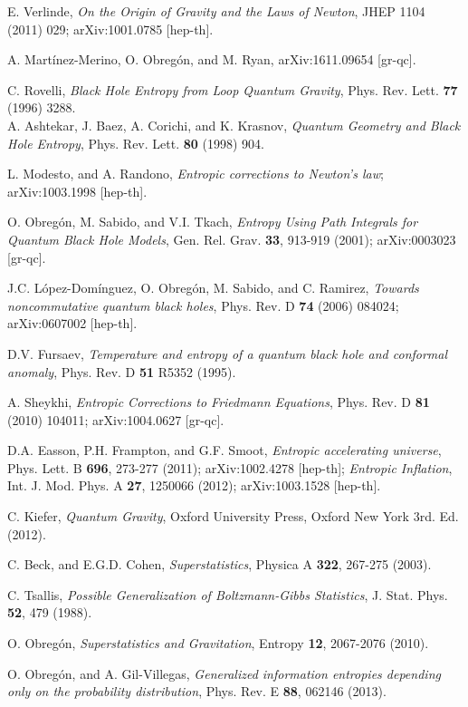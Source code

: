 \documentclass[nofootinbib,aps,prd,preprint,groupedaddress,showpacs,showkeys]{revtex4-1}
\begin{document}
\begin{thebibliography}{99}
 E. Verlinde, {\it On the Origin of Gravity and the Laws of Newton}, JHEP 1104 (2011) 029; arXiv:1001.0785 [hep-th].

 A. Mart\'inez-Merino, O. Obreg\'on, and M. Ryan, arXiv:1611.09654 [gr-qc].

 C. Rovelli, \textit{Black Hole Entropy from Loop Quantum Gravity}, Phys. Rev. Lett. {\bf 77} (1996) 3288.\\
A. Ashtekar, J. Baez, A. Corichi, and K. Krasnov, \textit{Quantum Geometry and Black Hole Entropy}, Phys. Rev. Lett. {\bf 80} (1998) 904.

 L. Modesto, and A. Randono, \textit{Entropic corrections to Newton's law}; arXiv:1003.1998 [hep-th].

 O. Obreg\'on, M. Sabido, and V.I. Tkach, \textit{Entropy Using Path Integrals for Quantum Black Hole Models}, Gen. Rel. Grav. {\bf 33}, 913-919 (2001); arXiv:0003023 [gr-qc].

 J.C. L\'opez-Dom\'inguez, O. Obreg\'on, M. Sabido, and C. Ramirez, \textit{Towards noncommutative quantum black holes}, Phys. Rev. D {\bf 74} (2006) 084024; arXiv:0607002 [hep-th].

 D.V. Fursaev, \textit{Temperature and entropy of a quantum black hole and conformal anomaly}, Phys. Rev. D {\bf 51} R5352 (1995).

 A. Sheykhi, {\it Entropic Corrections to Friedmann Equations}, Phys. Rev. D {\bf 81} (2010) 104011; arXiv:1004.0627 [gr-qc].

 D.A. Easson, P.H. Frampton, and G.F. Smoot, {\it Entropic accelerating universe}, Phys. Lett. B {\bf 696}, 273-277 (2011); arXiv:1002.4278 [hep-th]; {\it Entropic Inflation}, Int. J. Mod. Phys. A {\bf 27}, 1250066 (2012); arXiv:1003.1528 [hep-th].

 C. Kiefer, {\it Quantum Gravity}, Oxford University Press, Oxford New York 3rd. Ed. (2012).

 C. Beck, and E.G.D. Cohen, {\it Superstatistics}, Physica A {\bf 322}, 267-275 (2003).

 C. Tsallis, {\it Possible Generalization of Boltzmann-Gibbs Statistics}, J. Stat. Phys. {\bf 52}, 479 (1988).

 O. Obreg\'on, {\it Superstatistics and Gravitation}, Entropy {\bf 12}, 2067-2076 (2010).

 O. Obreg\'on, and A. Gil-Villegas, {\it Generalized information entropies depending only on the probability distribution}, Phys. Rev. E {\bf 88}, 062146 (2013).


\end{thebibliography}
\end{document}
